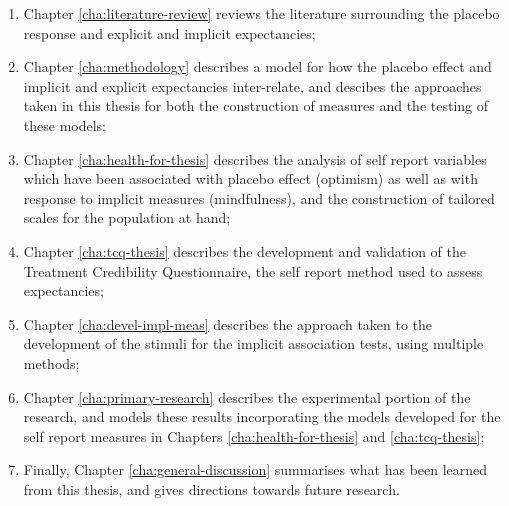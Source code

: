\begin{enumerate}
\item Chapter \ref{cha:literature-review} reviews the literature surrounding the placebo response and explicit and implicit expectancies;

\item Chapter \ref{cha:methodology} describes a model for how the placebo effect and implicit and explicit expectancies inter-relate, and descibes the approaches taken in this thesis for both the construction of measures and the testing of these models;


\item Chapter \ref{cha:health-for-thesis} describes the analysis of self report variables which have been associated with placebo effect (optimism) as well as with response to implicit measures (mindfulness), and the construction of tailored scales for the population at hand;

\item Chapter \ref{cha:tcq-thesis} describes the development and validation of the Treatment Credibility Questionnaire, the self report method used to assess expectancies;

\item Chapter \ref{cha:devel-impl-meas} describes the approach taken to the development of the stimuli for the implicit association tests, using multiple methods;

\item Chapter \ref{cha:primary-research} describes the experimental portion of the research, and models these results incorporating the models developed for the self report measures in Chapters \ref{cha:health-for-thesis} and \ref{cha:tcq-thesis};

\item Finally, Chapter \ref{cha:general-discussion} summarises what has been learned from this thesis, and gives directions towards future research.

\end{enumerate}




